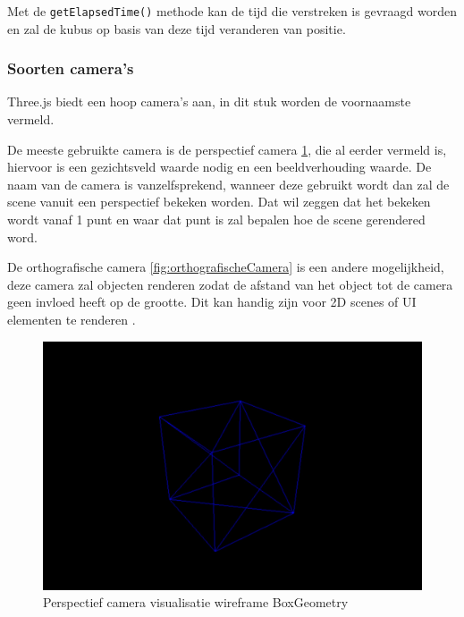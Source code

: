 Met de \texttt{getElapsedTime()} methode kan de tijd die verstreken is gevraagd worden en zal de kubus op basis van deze tijd veranderen van positie. 

\subsubsection{Soorten camera's}

Three.js biedt een hoop camera's aan, in dit stuk worden de voornaamste vermeld.

De meeste gebruikte camera is de perspectief camera \ref{fig:perspectiefCamera}, die al eerder vermeld is, hiervoor is een gezichtsveld waarde nodig en een beeldverhouding waarde. De naam van de camera is vanzelfsprekend, wanneer deze gebruikt wordt dan zal de scene vanuit een perspectief bekeken worden. Dat wil zeggen dat het bekeken wordt vanaf 1 punt en waar dat punt is zal bepalen hoe de scene gerendered word.

De orthografische camera \ref{fig:orthografischeCamera} is een andere mogelijkheid, deze camera zal objecten renderen zodat de afstand van het object tot de camera geen invloed heeft op de grootte. Dit kan handig zijn voor 2D scenes of UI elementen te renderen \autocite{threejs2023}.

\begin{figure}
	\centering
	\includegraphics[width=1\linewidth]{graphics/perspectiefCamera}
	\caption[Perspectief camera visualisatie]{Perspectief camera visualisatie wireframe BoxGeometry}
	\label{fig:perspectiefCamera}
\end{figure}


